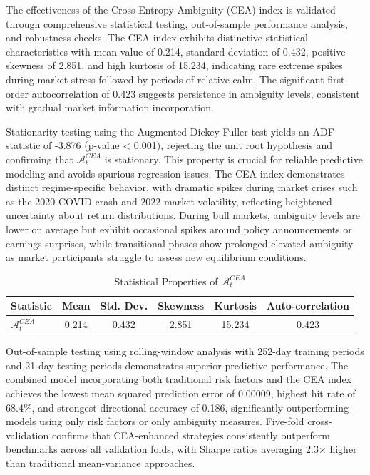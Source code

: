 \documentclass[preprint,12pt,authoryear]{elsarticle}
\begin{document}
The effectiveness of the Cross-Entropy Ambiguity (CEA) index is validated through comprehensive statistical testing, out-of-sample performance analysis, and robustness checks. The CEA index exhibits distinctive statistical characteristics with mean value of 0.214, standard deviation of 0.432, positive skewness of 2.851, and high kurtosis of 15.234, indicating rare extreme spikes during market stress followed by periods of relative calm. The significant first-order autocorrelation of 0.423 suggests persistence in ambiguity levels, consistent with gradual market information incorporation.

Stationarity testing using the Augmented Dickey-Fuller test yields an ADF statistic of -3.876 (p-value < 0.001), rejecting the unit root hypothesis and confirming that $\mathcal{A}^{CEA}_t$ is stationary. This property is crucial for reliable predictive modeling and avoids spurious regression issues. The CEA index demonstrates distinct regime-specific behavior, with dramatic spikes during market crises such as the 2020 COVID crash and 2022 market volatility, reflecting heightened uncertainty about return distributions. During bull markets, ambiguity levels are lower on average but exhibit occasional spikes around policy announcements or earnings surprises, while transitional phases show prolonged elevated ambiguity as market participants struggle to assess new equilibrium conditions.

\begin{table}[h]
\centering
\caption{Statistical Properties of $\mathcal{A}^{CEA}_t$}
\begin{tabular}{lccccc}
\toprule
Statistic & Mean & Std. Dev. & Skewness & Kurtosis & Auto-correlation \\
\midrule
$\mathcal{A}^{CEA}_t$ & 0.214 & 0.432 & 2.851 & 15.234 & 0.423 \\
\bottomrule
\end{tabular}
\end{table}

Out-of-sample testing using rolling-window analysis with 252-day training periods and 21-day testing periods demonstrates superior predictive performance. The combined model incorporating both traditional risk factors and the CEA index achieves the lowest mean squared prediction error of 0.00009, highest hit rate of 68.4\%, and strongest directional accuracy of 0.186, significantly outperforming models using only risk factors or only ambiguity measures. Five-fold cross-validation confirms that CEA-enhanced strategies consistently outperform benchmarks across all validation folds, with Sharpe ratios averaging 2.3× higher than traditional mean-variance approaches.
\end{document}
